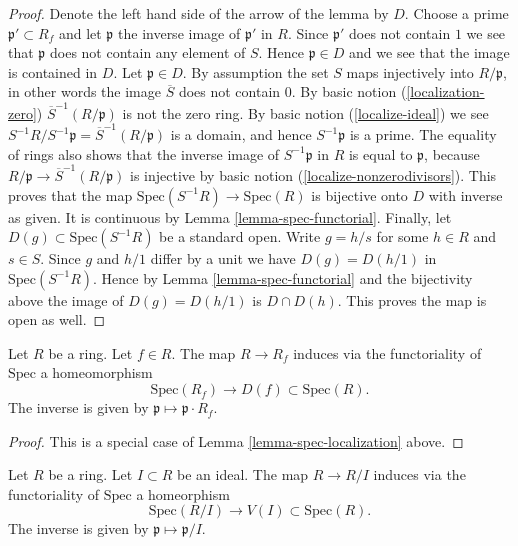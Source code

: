 \begin{proof}
Denote the left hand side of the arrow of the lemma by $D$.
Choose a prime $\mathfrak p' \subset R_f$ and let $\mathfrak p$
the inverse image of $\mathfrak p'$ in $R$. Since $\mathfrak p'$
does not contain $1$ we see that $\mathfrak p$ does not contain
any element of $S$. Hence $\mathfrak p \in D$ and we see that
the image is contained in $D$. Let $\mathfrak p \in D$. By assumption
the set $S$ maps injectively into $R/\mathfrak p$, in other
words the image $\overline{S}$ does not contain $0$.
By basic notion (\ref{localization-zero})
$\overline{S}^{-1}(R/\mathfrak p)$ is not the zero ring.
By basic notion (\ref{localize-ideal}) we see
$S^{-1}R / S^{-1}\mathfrak p = \overline{S}^{-1}(R/\mathfrak p)$
is a domain, and hence $S^{-1}\mathfrak p$ is a prime.
The equality of rings also shows that the inverse image of
$S^{-1}\mathfrak p$ in $R$ is equal to $\mathfrak p$,
because $R/\mathfrak p \to \overline{S}^{-1}(R/\mathfrak p)$
is injective by basic notion (\ref{localize-nonzerodivisors}).
This proves that the map $\text{Spec}(S^{-1}R) \to \text{Spec}(R)$
is bijective onto $D$ with inverse as given.
It is continuous by Lemma \ref{lemma-spec-functorial}.
Finally, let $D(g) \subset \text{Spec}(S^{-1}R)$ be a standard
open. Write $g = h/s$ for some $h\in R$ and $s\in S$.
Since $g$ and $h/1$ differ by a unit we have $D(g) = 
D(h/1)$ in $\text{Spec}(S^{-1}R)$.
Hence by Lemma \ref{lemma-spec-functorial} and the bijectivity
above the image of $D(g) = D(h/1)$ is $D \cap D(h)$.
This proves the map is open as well.
\end{proof}

\begin{lemma}
\label{lemma-standard-open}
Let $R$ be a ring. Let $f \in R$.
The map $R \to R_f$ induces via the functoriality of
$\text{Spec}$ a homeomorphism
$$
\text{Spec}(R_f) \longrightarrow D(f) \subset \text{Spec}(R).
$$
The inverse is given by $\mathfrak p \mapsto \mathfrak p \cdot R_f$.
\end{lemma}

\begin{proof}
This is a special case of Lemma \ref{lemma-spec-localization}
above.
\end{proof}

\begin{lemma}
\label{lemma-spec-closed}
Let $R$ be a ring. Let $I \subset R$ be an ideal.
The map $R \to R/I$ induces via the functoriality of
$\text{Spec}$ a homeorphism
$$
\text{Spec}(R/I) \longrightarrow V(I) \subset \text{Spec}(R).
$$
The inverse is given by $\mathfrak p \mapsto \mathfrak p / I$.
\end{lemma}

